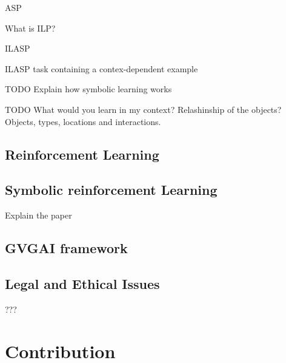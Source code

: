 \documentclass[12pt,twoside]{report}
\begin{document}
ASP

What is ILP?

ILASP


ILASP task containing a contex-dependent example



TODO Explain how symbolic learning works

TODO What would you learn in my context? Relashinship of the objects?
Objects, types, locations and interactions.


\section{Reinforcement Learning}


\section{Symbolic reinforcement Learning}


Explain the paper


\section{GVGAI framework}




\section{Legal and Ethical Issues}
???


\chapter{Contribution}


%
%



\end{document}
